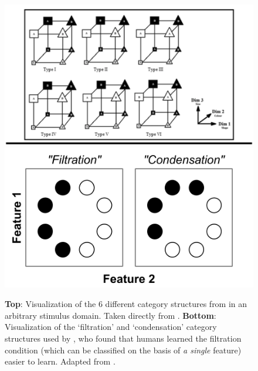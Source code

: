 \documentclass[12pt]{article}
\let\oldtextcite=\textcite
\renewcommand{\textcite}[1]{\textcolor[rgb]{0, .121, .388}{\oldtextcite{#1}}}
\begin{document}
\begin{figure}[H]
    \centering
    \includegraphics[scale=.4]{figures/shj6.png}
    \includegraphics[scale=.4]{figures/krushke1993.png}
    \caption{\textbf{Top}: Visualization of the 6 different category structures from \textcite{shepard1961learning} in an arbitrary stimulus domain. Taken directly from \textcite{morgan2020comparing}. \textbf{Bottom}: Visualization of the `filtration' and `condensation' category structures used by \textcite{kruschke1993human}, who found that humans learned the filtration condition (which can be classified on the basis of \emph{a single} feature) easier to learn. Adapted from \textcite{kruschke1993human}.} 
    \label{fig:categoryStructs}
\end{figure} 
\end{document}
